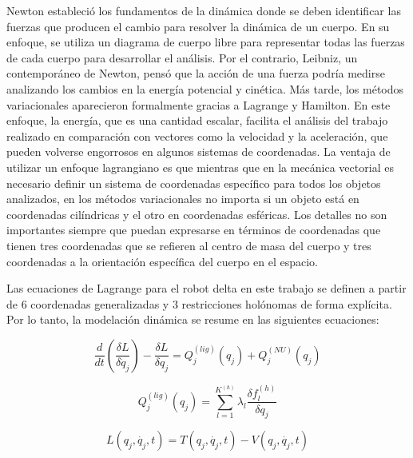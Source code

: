          Newton estableció los fundamentos de la dinámica donde se deben identificar las fuerzas que producen el cambio para resolver la dinámica de un cuerpo. En su enfoque, se utiliza un diagrama de cuerpo libre para representar todas las fuerzas de cada cuerpo para desarrollar el análisis. Por el contrario, Leibniz, un contemporáneo de Newton, pensó que la acción de una fuerza podría medirse analizando los cambios en la energía potencial y cinética. Más tarde, los métodos variacionales aparecieron formalmente gracias a Lagrange y Hamilton. En este enfoque, la energía, que es una cantidad escalar, facilita el análisis del trabajo realizado en comparación con vectores como la velocidad y la aceleración, que pueden volverse engorrosos en algunos sistemas de coordenadas. La ventaja de utilizar un enfoque lagrangiano es que mientras que en la mecánica vectorial es necesario definir un sistema de coordenadas específico para todos los objetos analizados, en los métodos variacionales no importa si un objeto está en coordenadas cilíndricas y el otro en coordenadas esféricas. Los detalles no son importantes siempre que puedan expresarse en términos de coordenadas que tienen tres coordenadas que se refieren al centro de masa del cuerpo y tres coordenadas a la orientación específica del cuerpo en el espacio.

    \newpage
            
        Las ecuaciones de Lagrange para el robot delta en este trabajo se definen a partir de 6 coordenadas generalizadas y 3 restricciones holónomas de forma explícita. Por lo tanto, la modelación dinámica se resume en las siguientes ecuaciones:
            
        \begin{equation}
         \frac{d}{dt} \left( \frac{ \delta L}{ \delta \dot{q}_{j}} \right) -\frac{ \delta L}{ \delta q_{j}}=Q_{j}^{ \left( lig \right) } \left( q_{j} \right) +Q_{j}^{ \left( NU \right) } \left( q_{j} \right)
             \label{eq:cap4_dina_ma_4}
        \end{equation}
        
        \begin{equation}
         Q_{j}^{ \left( lig \right) } \left( q_{j} \right) = \sum _{l=1}^{K^{ \left( h \right) }} \lambda _{l}\frac{ \delta f_{l}^{ \left( h \right) }}{ \delta q_{j}}
             \label{eq:cap4_dina_ma_5}
        \end{equation}
        
         \begin{equation}
          L \left( q_{j},\dot{q_{j}},t \right) =T \left( q_{j},\dot{q_{j}},t \right) -V \left( q_{j},\dot{q_{j}},t \right)
        \label{eq:cap4_dina_ma_6}
        \end{equation}
        
